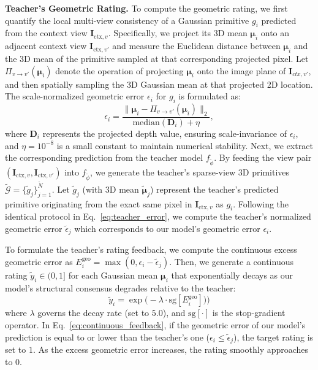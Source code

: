 \noindent \textbf{Teacher's Geometric Rating.} 
To compute the geometric rating, we first quantify the local multi-view consistency of a Gaussian primitive $g_i$ predicted from the context view $\bm{I}_{\text{ctx},v}$. Specifically, we project its 3D mean $\bm{\mu}_i$ onto an adjacent context view $\bm{I}_{\text{ctx},v'}$ and measure the Euclidean distance between $\bm{\mu}_i$ and the 3D mean of the primitive sampled at that corresponding projected pixel. Let $\Pi_{v \to v'}(\bm{\mu}_i)$ denote the operation of projecting $\bm{\mu}_i$ onto the image plane of $\bm{I}_{ctx,v'}$, and then spatially sampling the 3D Gaussian mean at that projected 2D location. The scale-normalized geometric error $\epsilon_i$ for $g_i$ is formulated as:
\begin{equation}
    \epsilon_i = \frac{\big\| \bm{\mu}_i - \Pi_{v \to v'}(\bm{\mu}_i) \big\|_2}{\text{median}(\bm{D}_i) + \eta},
    \label{eq:teacher_error}
\end{equation}
where $\bm{D}_i$ represents the projected depth value, ensuring scale-invariance of $\epsilon_i$, and $\eta = 10^{-8}$ is a small constant to maintain numerical stability. Next, we extract the corresponding prediction from the teacher model $f_{\tilde{\phi}}$. By feeding the view pair $(\bm{I}_{\text{ctx},v}, \bm{I}_{\text{ctx},v'})$ into $f_{\tilde{\phi}}$, we generate the teacher's sparse-view 3D primitives $\tilde{\mathcal{G}} =  \{\tilde{g}_j\}_{j=1}^{\tilde{N}}$. Let $\tilde{g}_j$ (with 3D mean $\tilde{\bm{\mu}}_j$) represent the teacher's predicted primitive originating from the exact same pixel in $\bm{I}_{\text{ctx},v}$ as $g_i$. Following the identical protocol in Eq.~\ref{eq:teacher_error}, we compute the teacher's normalized geometric error $\tilde{\epsilon}_j$ which corresponds to our model's geometric error $\epsilon_i$.

To formulate the teacher's rating feedback, we compute the continuous excess geometric error as $E^\text{geo}_i = \max(0, \epsilon_i - \tilde{\epsilon}_j)$. Then, we generate a continuous rating $\tilde{y}_i \in (0, 1]$ for each Gaussian mean ${\bm{\mu}}_i$ that exponentially decays as our model's structural consensus degrades relative to the teacher:
\begin{equation}
    \tilde{y}_i = \exp\Big(-\lambda \cdot \text{sg}[E^\text{geo}_i])\Big)
    \label{eq:continuous_feedback}
\end{equation}
where $\lambda$ governs the decay rate (set to $5.0$), and $\text{sg}[\cdot]$ is the stop-gradient operator. In Eq.~\ref{eq:continuous_feedback}, if the geometric error of our model's prediction is equal to or lower than the teacher's one ($\epsilon_i \le \tilde{\epsilon}_j$), the target rating is set to $1$. As the excess geometric error increases, the rating smoothly approaches to $0$.


